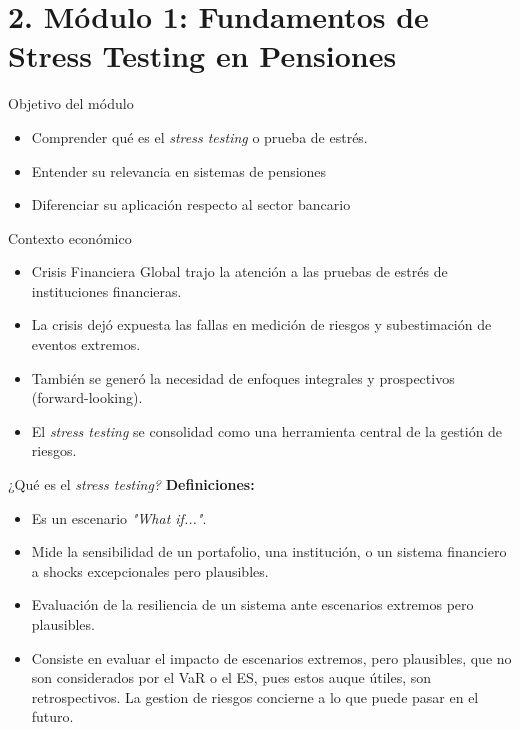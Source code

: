 \documentclass{beamer}
\begin{document}
\section{2. Módulo 1: Fundamentos de Stress Testing en Pensiones}
\begin{frame}[t]{Objetivo del módulo}
\begin{itemize}
\item Comprender qué es el \textit{stress testing} o prueba de estrés.
\item Entender su relevancia en sistemas de pensiones
\item Diferenciar su aplicación respecto al sector bancario
\end{itemize}
\end{frame}

\begin{frame}[t]{Contexto económico}

\begin{itemize}
    \item Crisis Financiera Global trajo la atención a las pruebas de estrés de instituciones financieras.
    \vspace{0.3cm}
    \item La crisis dej\'o expuesta las fallas en medici\'on de riesgos y subestimaci\'on de eventos extremos.
    \vspace{0.3cm}
    \item Tambi\'en se gener\'o la necesidad de enfoques integrales y prospectivos (forward-looking).
    \vspace{0.3cm}
    \item El \textit{stress testing} se consolidad como una herramienta central de la gesti\'on de riesgos.
\end{itemize}

\end{frame}
\begin{frame}[t]{¿Qué es el \textit{stress testing?}}
\textbf{Definiciones:}
\begin{itemize}

    \item Es un escenario \textit{"What if..."}.
    \vspace{0.3cm}
    \item Mide la sensibilidad de un portafolio, una institución, o un sistema financiero a shocks excepcionales pero plausibles.
    \vspace{0.3cm}
    \item Evaluación de la resiliencia de un sistema ante escenarios extremos pero plausibles.
    \vspace{0.3cm}
    \item Consiste en evaluar el impacto de escenarios extremos, pero plausibles,  que no son considerados por el VaR o el ES, pues estos auque útiles, son retrospectivos. La gestion de riesgos concierne a lo que puede pasar en el futuro.
\end{itemize}

\end{frame}
\end{document}
